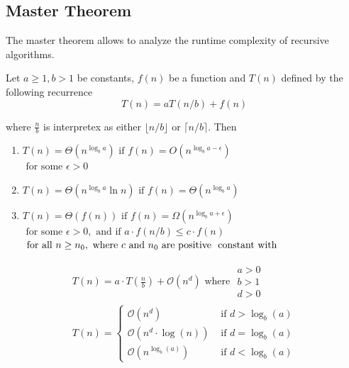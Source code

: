 \documentclass[10pt,a4paper,twocolumn]{article}
\begin{document}
\subsection{Master Theorem}
The master theorem allows to analyze the runtime complexity of recursive algorithms.

Let $a \geq 1, b > 1$ be constants, $f(n)$ be a function and $T(n)$ defined by the following recurrence\\
$$
T(n)=a T(n / b)+f(n)
$$

where $\frac{n}{b}$ is interpretex as either $\lfloor n / b\rfloor$ or $\lceil n / b\rceil$. Then

\begin{enumerate}
	\item $T(n)=\Theta\left(n^{\log _{b} a}\right) \text { if } f(n)=O \left(n^{\log _{b} a-\epsilon}\right) $ \\ $\text { for some } \epsilon>0 $
	\item $T(n)=\Theta\left(n^{\log _{b} a} \ln n\right) \text { if } f(n)=\Theta\left(n^{\log _{b} a}\right)$
	\item $T(n)=\Theta(f(n)) \text { if } f(n)=\Omega\left(n^{\log _{b} a+\epsilon}\right)$ \\ $ \text { for some } \epsilon>0, \text { and if }  a \cdot f(n / b) \leq c \cdot f(n) $ \\ $\text{ for all } n \geq n_{0}, \text { where } c \text { and } n_{0} \text { are positive } \\ \text { constant with } $
\end{enumerate}


$$
\begin{array}{l}T(n)=a \cdot T\left(\frac{n}{b}\right)+\mathcal{O}{(n^{d})} \text { where } \begin{array}{r}a>0 \\ b>1 \\ d>0\end{array} \\
	
T(n)=\left\{\begin{array}{ll}\mathcal{O}\left(n^{d}\right) 
		
& \text { if } d > \log _{b}(a)\\
\mathcal{O}\left(n^{d} \cdot \log (n)\right) & \text { if } d=\log _{b}(a) \\
\mathcal{O}\left(n^{\log_{b}(a)}\right) & \text { if } d<\log _{b}(a)\end{array}\right.\end{array}
$$
\end{document}
